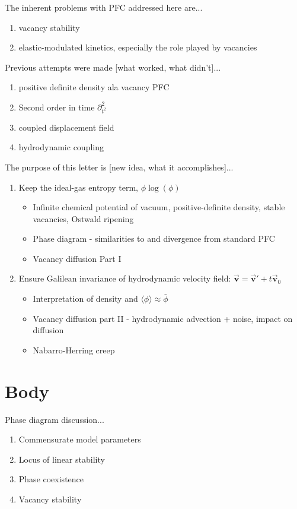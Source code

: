 \documentclass[%
 reprint,
 amsmath,amssymb,
 aps,
 prl,
]{revtex4-2}
\begin{document}
The inherent problems with PFC addressed here are...
\begin{enumerate}
    \item vacancy stability
    \item elastic-modulated kinetics, especially the role played by vacancies
\end{enumerate}

Previous attempts were made [what worked, what didn't]...
\begin{enumerate}
    \item positive definite density ala vacancy PFC
    \item Second order in time $\partial^2_{t^2}$
    \item coupled displacement field
    \item hydrodynamic coupling
\end{enumerate}

The purpose of this letter is [new idea, what it accomplishes]...
\begin{enumerate}
    \item Keep the ideal-gas entropy term, $\phi \log(\phi)$
    \begin{itemize}
        \item Infinite chemical potential of vacuum, positive-definite density, stable vacancies, Ostwald ripening
        \item Phase diagram - similarities to and divergence from standard PFC
        \item Vacancy diffusion Part I
    \end{itemize}
    \item Ensure Galilean invariance of hydrodynamic velocity field: $\vec{\mathbf{v}} = \vec{\mathbf{v}}' + t \vec{\mathbf{v}}_0$
    \begin{itemize}
        \item Interpretation of density and $\langle \phi \rangle \approx \bar{\phi}$
        \item Vacancy diffusion part II - hydrodynamic advection + noise, impact on diffusion
        \item Nabarro-Herring creep
    \end{itemize}
\end{enumerate}

\section{\label{sec:body}Body}

Phase diagram discussion...
\begin{enumerate}
    \item Commensurate model parameters
    \item Locus of linear stability
    \item Phase coexistence
    \item Vacancy stability
\end{enumerate}
\end{document}
